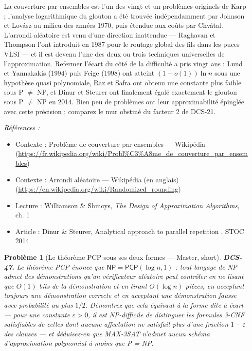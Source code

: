 \documentclass[11pt]{article}
\newtheorem{problem}{Problème}
\newenvironment{refs}{\par\small\noindent\emph{Références :}\begin{itemize}\setlength\itemsep{0pt}}{\end{itemize}\normalsize}
\begin{document}
\noindent La couverture par ensembles est l'un des vingt et un problèmes originels de Karp ; l'analyse logarithmique du glouton a été trouvée indépendamment par Johnson et Lovász au milieu des années 1970, puis étendue aux coûts par Chvátal. L'arrondi aléatoire est venu d'une direction inattendue --- Raghavan et Thompson l'ont introduit en 1987 pour le routage global des fils dans les puces VLSI --- et il est devenu l'une des deux ou trois techniques universelles de l'approximation. Refermer l'écart du côté de la difficulté a pris vingt ans : Lund et Yannakakis (1994) puis Feige (1998) ont atteint $ (1-o(1))\ln n $ sous une hypothèse quasi polynomiale, Raz et Safra ont obtenu une constante plus faible sous P $\ne$ NP, et Dinur et Steurer ont finalement égalé exactement le glouton sous P $\ne$ NP en 2014. Bien peu de problèmes ont leur approximabilité épinglée avec cette précision ; comparez le mur obstiné du facteur 2 de DCS-21.

\begin{refs}
\item Contexte : Problème de couverture par ensembles --- Wikipédia (\url{https://fr.wikipedia.org/wiki/Probl%C3%A8me_de_couverture_par_ensembles})
\item Contexte : Arrondi aléatoire --- Wikipédia (en anglais) (\url{https://en.wikipedia.org/wiki/Randomized_rounding})
\item Lecture : Williamson \& Shmoys, \textit{The Design of Approximation Algorithms}, ch. 1
\item Article : Dinur \& Steurer, \og{} Analytical approach to parallel repetition \fg{}, STOC 2014
\end{refs}

\bigskip

\begin{problem}[{Le théorème PCP sous ses deux formes --- Master, short}]
\textbf{DCS-47.} Le théorème PCP énonce que $ \mathsf{NP} = \mathsf{PCP}(\log n, 1) $ : tout langage de NP admet des démonstrations qu'un vérificateur aléatoire peut contrôler en ne lisant que $ O(1) $ bits de la démonstration et en tirant $ O(\log n) $ pièces, en acceptant toujours une démonstration correcte et en acceptant une démonstration fausse avec probabilité au plus $ 1/2 $. Démontrez que cela équivaut à la forme dite \og{} à écart \fg{} --- pour une constante $ \varepsilon > 0 $, il est NP-difficile de distinguer les formules 3-CNF satisfiables de celles dont aucune affectation ne satisfait plus d'une fraction $ 1 - \varepsilon $ des clauses --- et déduisez-en que MAX-3SAT n'admet aucun schéma d'approximation polynomial à moins que P = NP.
\end{problem}
\end{document}
